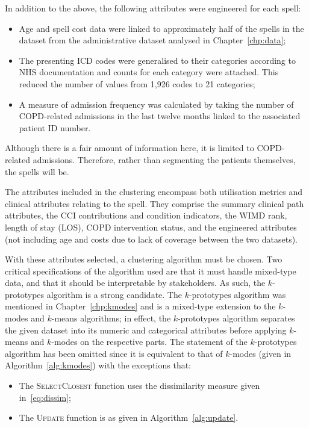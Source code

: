 In addition to the above, the following attributes were engineered for each
spell:

\begin{itemize}
    \item Age and spell cost data were linked to approximately half of the
        spells in the dataset from the administrative dataset analysed in
        Chapter~\ref{chp:data};
    \item The presenting ICD codes were generalised to their categories
        according to NHS documentation and counts for each category were
        attached. This reduced the number of values from
        1,926 codes to 21 categories;
    \item A measure of admission frequency was calculated by taking the number
        of COPD-related admissions in the last twelve months linked to the
        associated patient ID number.
\end{itemize}

Although there is a fair amount of information here, it is limited to
COPD-related admissions. Therefore, rather than segmenting the patients
themselves, the spells will be. 

The attributes included in the clustering
encompass both utilisation metrics and clinical attributes relating to the
spell. They comprise the summary clinical path attributes, the CCI contributions
and condition indicators, the WIMD rank, length of stay (LOS), COPD intervention
status, and the engineered attributes (not including age and costs due to lack
of coverage between the two datasets).

With these attributes selected, a clustering algorithm must be chosen. Two
critical specifications of the algorithm used are that it must handle mixed-type
data, and that it should be interpretable by stakeholders. As such, the
\(k\)-prototypes algorithm is a strong candidate. The \(k\)-prototypes algorithm
was mentioned in Chapter~\ref{chp:kmodes} and is a mixed-type extension to the
\(k\)-modes and \(k\)-means algorithms; in effect, the \(k\)-prototypes
algorithm separates the given dataset into its numeric and categorical
attributes before applying \(k\)-means and \(k\)-modes on the respective parts.
The statement of the \(k\)-prototypes algorithm has been omitted since it is
equivalent to that of \(k\)-modes (given in Algorithm~\ref{alg:kmodes}) with the
exceptions that:

\begin{itemize}
    \item The \textsc{SelectClosest} function uses the dissimilarity measure
        given in~\eqref{eq:dissim};
    \item The \textsc{Update} function is as given in
        Algorithm~\ref{alg:update}.
\end{itemize}


